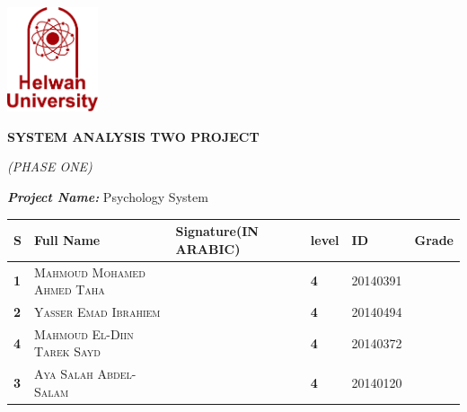 \documentclass[../Psychological_system_web_application.tex]{subfiles}
\begin{document}
	\begin{titlepage}
	
		\vspace*{0.8cm}
			\includegraphics[width=0.2\textwidth]{Logo}
	\begin{center}
			\vspace*{1cm}
			\Huge
			\textsc{\textbf{\color{red} SYSTEM ANALYSIS TWO PROJECT }}
			\vspace*{0.5cm}
			
			\LARGE
			 \textit{(PHASE ONE)}
	\end{center}
	\LARGE
			 \textit{\textbf{Project Name:}} Psychology System 
	\begin{center}
			\vspace*{0.2cm}
			\begin{table}[h]
			\centering
			\begin{tabular}[\textheight]{ | m{0.2cm} | m{6cm} | m{3cm} | m{1cm} | m{2cm} |m{2cm} |} 
							
				\hline
				\rowcolor{lightgray}
			 	\textbf{\large S}& \textbf{\large Full Name} & \textbf{\large Signature(IN ARABIC)}&\textbf{\large level} & \textbf{\large ID} & \textbf{\large Grade}\\[30pt]
				\hline
				
				\textbf{\large 1}& \textsc{Mahmoud Mohamed Ahmed Taha}& &\textbf{ 4}& \textsc{20140391} &  \\[30pt]
				\hline
				\rowcolor{lightgray}
				\textbf{\large 2}& \textsc{Yasser Emad Ibrahiem} & &\textbf{ 4} & \textsc{20140494} &  \\[30pt]
				\hline
				
				\textbf{\large 4}& \textsc{Mahmoud El-Diin Tarek Sayd } & &\textbf{ 4} & \textsc{20140372} &  \\[30pt]
				\hline
				\rowcolor{lightgray}
				\textbf{\large 3}& \textsc{Aya Salah Abdel-Salam} & &\textbf{ 4} & \textsc{20140120} &  \\[30pt]
				\hline
			  	
			\end{tabular}

		\end{table}

		\end{center}
		
	\end{titlepage}
\end{document}
